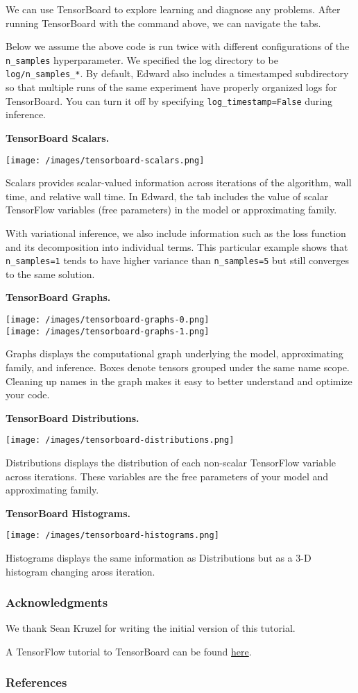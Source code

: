 We can use TensorBoard to explore learning and diagnose any problems.
After running TensorBoard with the command above, we can navigate the
tabs.

Below we assume the above code is run twice with different
configurations
of the \texttt{n\_samples} hyperparameter.
We specified the log directory to be \texttt{log/n\_samples\_*}.
By default, Edward also includes a timestamped subdirectory so that
multiple runs of the same experiment have properly organized logs for
TensorBoard. You can turn it off by specifying
\texttt{log\_timestamp=False} during inference.

\textbf{TensorBoard Scalars.}

\texttt{[image: /images/tensorboard-scalars.png]}

Scalars provides scalar-valued information across iterations of the
algorithm, wall time, and relative wall time. In Edward, the tab
includes the value of scalar TensorFlow variables (free parameters) in
the model or approximating family.

With variational inference, we also include information such as the
loss function and its decomposition into individual terms. This
particular example shows that \texttt{n\_samples=1} tends to have higher
variance than \texttt{n\_samples=5} but still converges to the same solution.

\textbf{TensorBoard Graphs.}

\texttt{[image: /images/tensorboard-graphs-0.png]} \\
\texttt{[image: /images/tensorboard-graphs-1.png]}

Graphs displays the computational graph underlying the model,
approximating family, and inference. Boxes denote tensors grouped
under the same name scope. Cleaning up names in the graph makes it
easy to better understand and optimize your code.

\textbf{TensorBoard Distributions.}

\texttt{[image: /images/tensorboard-distributions.png]}

Distributions displays the distribution of each non-scalar TensorFlow
variable across iterations. These variables are the free parameters
of your model and approximating family.

\textbf{TensorBoard Histograms.}

\texttt{[image: /images/tensorboard-histograms.png]}

Histograms displays the same information as Distributions but as a 3-D
histogram changing aross iteration.

\subsubsection{Acknowledgments}

We thank Sean Kruzel for writing the initial version of this
tutorial.

A TensorFlow tutorial to TensorBoard can be found
\href{https://www.tensorflow.org/get_started/summaries_and_tensorboard}
{here}.

\subsubsection{References}\label{references}
